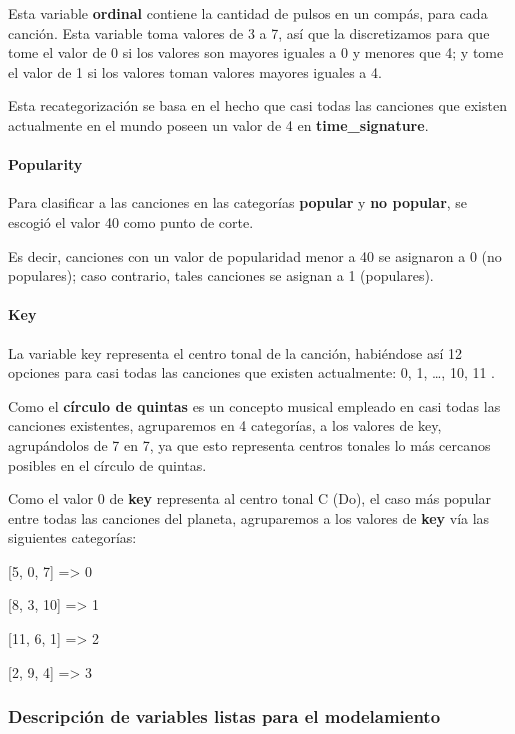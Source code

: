 \documentclass[
  letterpaper,
  DIV=11,
  numbers=noendperiod]{scrartcl}
\let\oldparagraph\paragraph
\renewcommand{\paragraph}[1]{\oldparagraph{#1}\mbox{}}
\begin{document}
Esta variable \textbf{ordinal} contiene la cantidad de pulsos en un
compás, para cada canción. Esta variable toma valores de 3 a 7, así que
la discretizamos para que tome el valor de 0 si los valores son mayores
iguales a 0 y menores que 4; y tome el valor de 1 si los valores toman
valores mayores iguales a 4.

Esta recategorización se basa en el hecho que casi todas las canciones
que existen actualmente en el mundo poseen un valor de 4 en
\textbf{time\_signature}.

\hypertarget{popularity}{%
\paragraph{Popularity}\label{popularity}}

Para clasificar a las canciones en las categorías \textbf{popular} y
\textbf{no popular}, se escogió el valor 40 como punto de corte.

Es decir, canciones con un valor de popularidad menor a 40 se asignaron
a 0 (no populares); caso contrario, tales canciones se asignan a 1
(populares).

\hypertarget{key}{%
\paragraph{Key}\label{key}}

La variable key representa el centro tonal de la canción, habiéndose así
12 opciones para casi todas las canciones que existen actualmente: 0, 1,
\ldots, 10, 11 .

Como el \textbf{círculo de quintas} es un concepto musical empleado en
casi todas las canciones existentes, agruparemos en 4 categorías, a los
valores de key, agrupándolos de 7 en 7, ya que esto representa centros
tonales lo más cercanos posibles en el círculo de quintas.

Como el valor 0 de \textbf{key} representa al centro tonal C (Do), el
caso más popular entre todas las canciones del planeta, agruparemos a
los valores de \textbf{key} vía las siguientes categorías:

{[}5, 0, 7{]} =\textgreater{} 0

{[}8, 3, 10{]} =\textgreater{} 1

{[}11, 6, 1{]} =\textgreater{} 2

{[}2, 9, 4{]} =\textgreater{} 3

\hypertarget{descripciuxf3n-de-variables-listas-para-el-modelamiento}{%
\subsubsection{Descripción de variables listas para el
modelamiento}\label{descripciuxf3n-de-variables-listas-para-el-modelamiento}}
\end{document}
